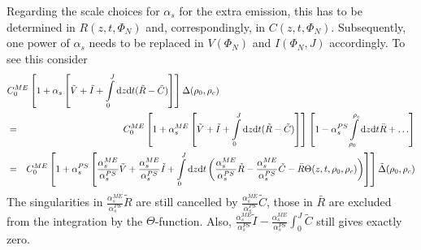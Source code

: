 \documentclass[a4paper,10pt]{scrartcl}
\newcommand{\done}{{\rm d}}
\newcommand{\nnb}{\nonumber}
\begin{document}
Regarding the scale choices for $\alpha_s$ for the extra emission, this has to 
be determined in $R(z,t,\Phi_N)$ and, correspondingly, in $C(z,t,\Phi_N)$.
Subsequently, one power of $\alpha_s$ needs to be replaced in $V(\Phi_N)$ and
$I(\Phi_N,J)$ accordingly. To see this consider
\begin{eqnarray}
\lefteqn{
 C_0^{ME}\left[1+\alpha_s
		\left[\tilde V+\tilde I
			+\int\limits_0^J\done z\done t(\tilde R-\tilde C)
		\right]
	\right]
	\Delta(\rho_0,\rho_c)} \nnb\\
& = & C_0^{ME}\left[1+\alpha_s^{ME}
		\left[\tilde V+\tilde I
			+\int\limits_0^J\done z\done t(\tilde R-\tilde C)
		\right]
	\right]
	\left[1-\alpha_s^{PS}\int\limits_{\rho_0}^{\rho_c}\done z\done t\bar R + \ldots\right] \\
& = & C_0^{ME}\left[1+\alpha_s^{PS}
		\left[\frac{\alpha_s^{ME}}{\alpha_s^{PS}}\tilde V
			+\frac{\alpha_s^{ME}}{\alpha_s^{PS}}\tilde I
			+\int\limits_0^J\done z\done t
				\left(\frac{\alpha_s^{ME}}{\alpha_s^{PS}}\tilde R
					-\frac{\alpha_s^{ME}}{\alpha_s^{PS}}\tilde C
					-\bar R \Theta(z,t,\rho_0,\rho_c)
				\right)
		\right]
	\right]
	\tilde\Delta(\rho_0,\rho_c)
\end{eqnarray}
The singularities in $\frac{\alpha_s^{ME}}{\alpha_s^{PS}}\tilde R$ are
still cancelled by $\frac{\alpha_s^{ME}}{\alpha_s^{PS}}\tilde C$, those
in $\bar R$ are excluded from the integration by the $\Theta$-function.
Also, $\frac{\alpha_s^{ME}}{\alpha_s^{PS}}\tilde I - 
\frac{\alpha_s^{ME}}{\alpha_s^{PS}}\int_0^J\tilde C$ still gives exactly zero.
\end{document}

